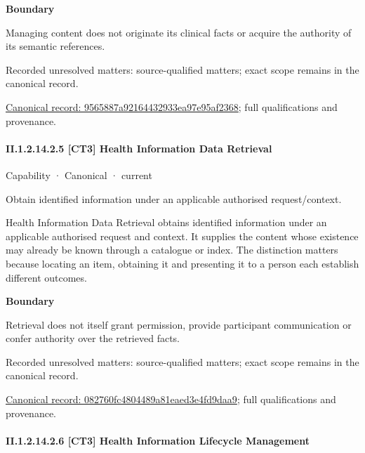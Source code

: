 \textbf{Boundary}



Managing content does not originate its clinical facts or acquire the authority of its semantic references.


{\small Recorded unresolved matters: source-qualified matters; exact scope remains in the canonical record.}\par
{\footnotesize \href{../../../../continuum/strategy/capability/9565887a92164432933ea97e95af2368.md}{Canonical record: 9565887a92164432933ea97e95af2368}; full qualifications and provenance.}\par
\paragraph*{II.1.2.14.2.5 [CT3] Health Information Data Retrieval}
\label{navigation:II.1.2.14.2.5}

\label{element:082760fc4804489a81eaed3e4fd9daa9}
{\small Capability · Canonical · current}\par

Obtain identified information under an applicable authorised request/context.



Health Information Data Retrieval obtains identified information under an applicable authorised request and context. It supplies the content whose existence may already be known through a catalogue or index. The distinction matters because locating an item, obtaining it and presenting it to a person each establish different outcomes.



\textbf{Boundary}



Retrieval does not itself grant permission, provide participant communication or confer authority over the retrieved facts.


{\small Recorded unresolved matters: source-qualified matters; exact scope remains in the canonical record.}\par
{\footnotesize \href{../../../../continuum/strategy/capability/082760fc4804489a81eaed3e4fd9daa9.md}{Canonical record: 082760fc4804489a81eaed3e4fd9daa9}; full qualifications and provenance.}\par
\paragraph*{II.1.2.14.2.6 [CT3] Health Information Lifecycle Management}
\label{navigation:II.1.2.14.2.6}

